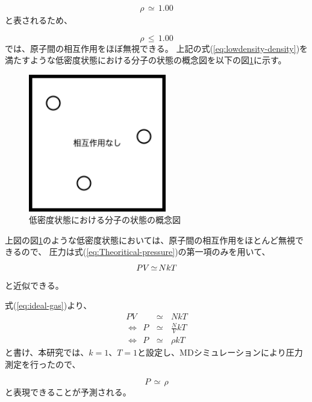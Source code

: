 \documentclass[titlepage]{jsreport}
\begin{document}
{{{\large
\begin{eqnarray}
\rho\,{\simeq}\,1.00 \nonumber
\end{eqnarray}
\normalsize
と表されるため、

\large
\begin{equation}
\rho\,{\leq}\,1.00 \label{eq:lowdensity-density}
\end{equation}
\normalsize
では、原子間の相互作用をほぼ無視できる。
上記の式(\ref{eq:lowdensity-density})を満たすような低密度状態における分子の状態の概念図を以下の図\ref{fig:lowdensity.png}に示す。

\begin{figure}[htbp]
    \begin{center}
        \includegraphics[width=6cm]{fig/lowdensity.png}
    \end{center}
    \caption{低密度状態における分子の状態の概念図}
    \label{fig:lowdensity.png}
\end{figure}

上図の図\ref{fig:lowdensity.png}のような低密度状態においては、原子間の相互作用をほとんど無視できるので、
圧力は式(\ref{eq:Theoritical-pressure})の第一項のみを用いて、
\large
\begin{equation}
PV\,{\simeq}\,NkT{\label{eq:ideal-gas}}
\end{equation}
\normalsize
と近似できる。


式(\ref{eq:ideal-gas})より、
\large
\begin{eqnarray}
PV\,&{\simeq}&\,NkT\nonumber\\
{\Leftrightarrow}{\ }{\ }P\,&{\simeq}&\,{\frac{N}{V}}kT\nonumber\\
{\Leftrightarrow}{\ }{\ }P\,&{\simeq}&\,{\rho}kT\nonumber
\end{eqnarray}
\normalsize
と書け、本研究では、$k=1$、$T=1$と設定し、MDシミュレーションにより圧力測定を行ったので、

\large
\begin{equation}
P\,{\simeq}\,{\rho} \label{eq:ideal-value}
\end{equation}
\normalsize
と表現できることが予測される。

}}}
\end{document}
